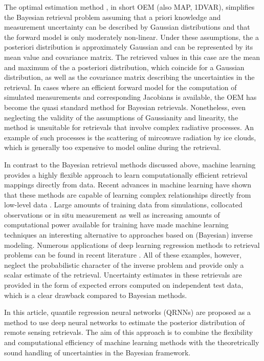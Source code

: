 \documentclass[journal abbreviation, manuscript]{copernicus}
\begin{document}
The optimal estimation method \citep{rodgers}, in short OEM (also MAP, 1DVAR),
simplifies the Bayesian retrieval problem assuming that a priori knowledge and
measurement uncertainty can be described by Gaussian distributions and that the
forward model is only moderately non-linear. Under these assumptions, the a
posteriori distribution is approximately Gaussian and can be represented by its
mean value and covariance matrix. The retrieved values in this case are the mean
and maximum of the a posteriori distribution, which coincide for a Gaussian
distribution, as well as the covariance matrix describing the uncertainties in
the retrieval. In cases where an efficient forward model for the computation of
simulated measurements and corresponding Jacobians is available, the OEM has
become the quasi standard method for Bayesian retrievals. Nonetheless, even
neglecting the validity of the assumptions of Gaussianity and linearity, the
method is unsuitable for retrievals that involve complex radiative processes. An
example of such processes is the scattering of mircowave radiation by ice
clouds, which is generally too expensive to model online during the retrieval.

In contrast to the Bayesian retrieval methods discussed above, machine learning
provides a highly flexible approach to learn computationally efficient retrieval
mappings directly from data. Recent advances in machine learning have shown that
these methods are capable of learning complex relationships directly from
low-level data \citep{lecun}. Large amounts of training data from simulations,
collocated observations or in situ measurement as well as increasing amounts of
computational power available for training have made machine learning techniques
an interesting alternative to approaches based on (Bayesian) inverse modeling.
Numerous applications of deep learning regression methods to retrieval problems
can be found in recent literature \citep{holl, strandgren, hakansson}. All of
these examples, however, neglect the probabilistic character of the inverse
problem and provide only a scalar estimate of the retrieval. Uncertainty
estimates in these retrievals are provided in the form of expected errors
computed on independent test data, which is a clear drawback compared to
Bayesian methods.

In this article, quantile regression neural networks (QRNNs) are proposed as a
method to use deep neural networks to estimate the posterior distribution of
remote sensing retrievals. The aim of this approach is to combine the
flexibility and computational efficiency of machine learning methods with the
theoretrically sound handling of uncertainties in the Bayesian framework. 
\end{document}
